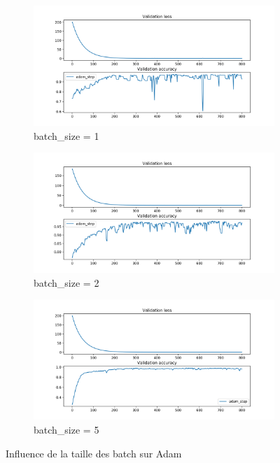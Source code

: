 \documentclass[fleqn,11pt, titlepage, french]{article}
\begin{document}
			\begin{figure}[H]
	\centering
	\begin{subfigure}{0.45\textwidth}
		\centering
		\includegraphics[scale=0.29]{../gdsvm/exports/mnist-batch1-adam_step.png}
		\caption{batch\_size = 1}
	\end{subfigure}
	\begin{subfigure}{0.45\textwidth}
		\centering
		\includegraphics[scale=0.29]{../gdsvm/exports/mnist-batch2-adam_step.png}
		\caption{batch\_size = 2}
	\end{subfigure}
	\begin{subfigure}{1\textwidth}
		\centering
		\includegraphics[scale=0.4]{../gdsvm/exports/mnist-batch5-adam_step.png}
		\caption{batch\_size = 5}
	\end{subfigure}
	
	\caption{Influence de la taille des batch sur Adam}
\end{figure}
\end{document}
